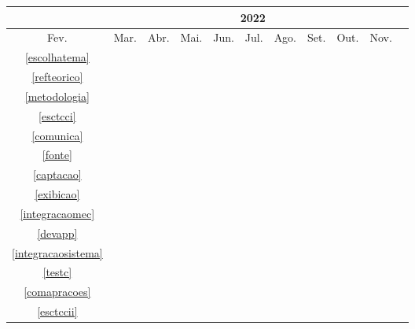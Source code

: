 \begin{table}[!htbp]
	\centering
		\begin{tabular}{|c|c|c|c|c|c|c|c|c|c|c|}
		\hline
		&\multicolumn{9}{c|}{2022}\\
		\hline
		Fev.&Mar.&Abr.&Mai.&Jun.&Jul.&Ago.&Set.&Out.&Nov.\\
		\hline
		\ref{escolhatema}&\cellcolor{midgray}&&&&&&&&\\
		\hline
		\ref{refteorico}&&\cellcolor{midgray}&\cellcolor{midgray}&\cellcolor{midgray}&&&&&\\
		\hline
		\ref{metodologia}&&&\cellcolor{midgray}&\cellcolor{midgray}&&&&&\\
		\hline
		\ref{esctcci}&&\cellcolor{midgray}&\cellcolor{midgray}&\cellcolor{midgray}&&&&&\\
		\hline
		\ref{comunica}&&&&&\cellcolor{midgray}&&&&\\
		\hline
		\ref{fonte}&&&&&\cellcolor{midgray}&\cellcolor{midgray}&&&\\
		\hline	
		\ref{captacao}&&&&&&\cellcolor{midgray}&&&\\
		\hline
		\ref{exibicao}&&&&&&\cellcolor{midgray}&\cellcolor{midgray}&\cellcolor{midgray}&\\
		\hline
		\ref{integracaomec}&&&&&&&\cellcolor{midgray}&\cellcolor{midgray}&\\
		\hline
		\ref{devapp}&&&&&&&&\cellcolor{midgray}&\\
		\hline	
		\ref{integracaosistema}&&&&&&&&\cellcolor{midgray}&\\
		\hline	
		\ref{testc}&&&&&&&&\cellcolor{midgray}&\\
		\hline	
		\ref{comapracoes}&&&&&&&\cellcolor{midgray}&\cellcolor{midgray}&\cellcolor{midgray}\\
		\hline
		\ref{esctccii}&&&&&&&\cellcolor{midgray}&\cellcolor{midgray}&\cellcolor{midgray}\\
		\hline		
		\end{tabular}
\end{table}